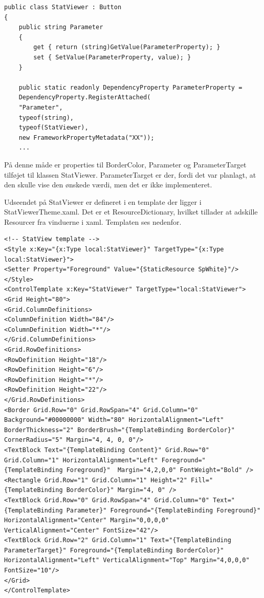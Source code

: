 \begin{lstlisting}[caption=StatViewer attatched property, label=code:StatViewer]
public class StatViewer : Button
{
	public string Parameter
	{
		get { return (string)GetValue(ParameterProperty); }
		set { SetValue(ParameterProperty, value); }
	}
	
	public static readonly DependencyProperty ParameterProperty =
	DependencyProperty.RegisterAttached(
	"Parameter",
	typeof(string),
	typeof(StatViewer),
	new FrameworkPropertyMetadata("XX"));
	...
\end{lstlisting}

På denne måde er properties til BorderColor, Parameter og ParameterTarget tilføjet til klassen StatViewer. ParameterTarget er der, fordi det var planlagt, at den skulle vise den ønskede værdi, men det er ikke implementeret.

Udseendet på StatViewer er defineret i en template der ligger i StatViewerTheme.xaml. Det er et ResourceDictionary, hvilket tillader at adskille Resourcer fra vinduerne i xaml.
Templaten ses nedenfor.

\begin{lstlisting}[caption=StatViewerTheme, label=code:StatViewerTheme]
<!-- StatView template -->
<Style x:Key="{x:Type local:StatViewer}" TargetType="{x:Type local:StatViewer}">
<Setter Property="Foreground" Value="{StaticResource SpWhite}"/>
</Style>
<ControlTemplate x:Key="StatViewer" TargetType="local:StatViewer">
<Grid Height="80">
<Grid.ColumnDefinitions>
<ColumnDefinition Width="84"/>
<ColumnDefinition Width="*"/>
</Grid.ColumnDefinitions>
<Grid.RowDefinitions>
<RowDefinition Height="18"/>
<RowDefinition Height="6"/>
<RowDefinition Height="*"/>
<RowDefinition Height="22"/>
</Grid.RowDefinitions>
<Border Grid.Row="0" Grid.RowSpan="4" Grid.Column="0" Background="#00000000" Width="80" HorizontalAlignment="Left" BorderThickness="2" BorderBrush="{TemplateBinding BorderColor}" CornerRadius="5" Margin="4, 4, 0, 0"/>
<TextBlock Text="{TemplateBinding Content}" Grid.Row="0"  Grid.Column="1" HorizontalAlignment="Left" Foreground="{TemplateBinding Foreground}"  Margin="4,2,0,0" FontWeight="Bold" />
<Rectangle Grid.Row="1" Grid.Column="1" Height="2" Fill="{TemplateBinding BorderColor}" Margin="4, 0" />
<TextBlock Grid.Row="0" Grid.RowSpan="4" Grid.Column="0" Text="{TemplateBinding Parameter}" Foreground="{TemplateBinding Foreground}" HorizontalAlignment="Center" Margin="0,0,0,0" VerticalAlignment="Center" FontSize="42"/>
<TextBlock Grid.Row="2" Grid.Column="1" Text="{TemplateBinding ParameterTarget}" Foreground="{TemplateBinding BorderColor}" HorizontalAlignment="Left" VerticalAlignment="Top" Margin="4,0,0,0" FontSize="10"/>
</Grid>
</ControlTemplate>
\end{lstlisting}

